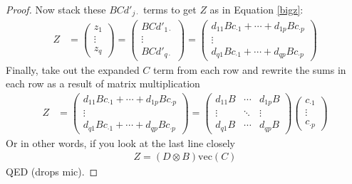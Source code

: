 \documentclass[a4paper,12pt]{scrartcl}
\begin{document}
\begin{proof}
\newpage
Now stack these $BCd'_{j\cdot}$ terms
to get $Z$ as in Equation \ref{bigz}:
\begin{align}
    Z &= \begin{pmatrix} z_1 \\ \vdots \\ z_q 
	\end{pmatrix} = 
	\begin{pmatrix} BCd'_{1\cdot} \\ \vdots \\ BCd'_{q\cdot} 
	\end{pmatrix} 
    = \begin{pmatrix} 
	    d_{1 1} Bc_{\cdot 1} + \cdots 
	    +  d_{1 p}Bc_{\cdot p} \\ 
	    \vdots \\
	    d_{q 1} Bc_{\cdot 1} + \cdots 
	    +  d_{q p}Bc_{\cdot p}  
	\end{pmatrix} 
\end{align}
Finally, take out the expanded $C$ term from
each row and rewrite the sums in each row
as a result of matrix multiplication
\begin{align}
    Z &=\begin{pmatrix} 
	    d_{1 1} Bc_{\cdot 1} + \cdots 
	    +  d_{1 p}Bc_{\cdot p} \\ 
	    \vdots \\
	    d_{q 1} Bc_{\cdot 1} + \cdots 
	    +  d_{q p}Bc_{\cdot p} 
	\end{pmatrix} 
    = \begin{pmatrix} 
	    d_{1 1} B & \cdots 
	    &  d_{1 p}B \\ 
	    \vdots & \ddots & \vdots \\
	    d_{q 1} B & \cdots 
	    &  d_{q p}B 
	\end{pmatrix} 
    \begin{pmatrix}
	c_{\cdot 1} \\ \vdots \\ c_{\cdot p}
    \end{pmatrix}
\end{align}
Or in other words, if you look at the
last line closely
\begin{align*}
    Z = (D\otimes B) \text{vec}(C)
\end{align*}
QED (drops mic).


    





\end{proof}
\end{document}
